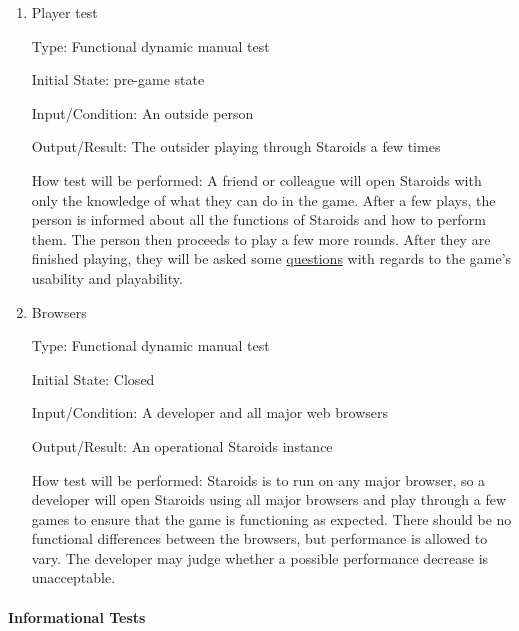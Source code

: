 \documentclass[12pt, titlepage]{article}
\begin{document}
\begin{enumerate}

\item{Player test\\}

Type: Functional dynamic manual test

Initial State: pre-game state

Input/Condition: An outside person

Output/Result: The outsider playing through Staroids a few times

How test will be performed: A friend or colleague will open Staroids with only the knowledge of what they can do in the game. After a few plays, the person is informed about all the functions of Staroids and how to perform them. The person then proceeds to play a few more rounds. After they are finished playing, they will be asked some \hyperref[interview:questions]{questions} with regards to the game's usability and playability.

\item{Browsers\\}

Type: Functional dynamic manual test

Initial State: Closed

Input/Condition: A developer and all major web browsers

Output/Result: An operational Staroids instance

How test will be performed: Staroids is to run on any major browser, so a developer will open Staroids using all major browsers and play through a few games to ensure that the game is functioning as expected. There should be no functional differences between the browsers, but performance is allowed to vary. The developer may judge whether a possible performance decrease is unacceptable.

\end{enumerate}

\paragraph{Informational Tests}
\end{document}
